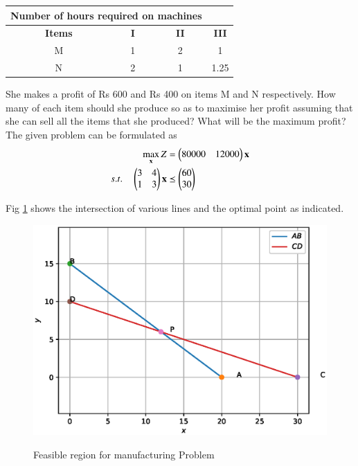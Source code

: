 \begin{enumerate}[label=\arabic*.,ref=\thesection.\theenumi]
\begin{tabular}{|c|c|c|c|}
\hline
 \multicolumn{3}{|l}{\textbf{ Number of hours required on machines}}& \\ \cline{2-4}
\hline
\textbf {Items}&\textbf{I}&\textbf{II}&\textbf{III}\\
\hline
M&1&2&1\\
\hline
 N&2&1&1.25\\
 \hline 

\end{tabular}

She makes a profit of Rs 600 and Rs 400 on items M and N respectively. How many
of each item should she produce so as to maximise her profit assuming that she can sell
all the items that she produced? What will be the maximum profit?
\\
\solution The given problem can be formulated as
\begin{align}
\max_{\mathbf{x}} Z &= \begin{pmatrix}80000&12000\end{pmatrix}\mathbf{x}
\\
s.t. \quad 
\begin{pmatrix}
3 & 4
\\
1 & 3
\end{pmatrix}
\mathbf{x} & \preceq \begin{pmatrix}60\\30\end{pmatrix}
\label{eq:manufacturing}
\end{align}

Fig  \ref{fig:manufacturing}
shows the intersection of various lines and the optimal point as indicated.
\begin{figure}[h]
\includegraphics[width=\columnwidth]{./figs/lp_manufacturing.eps}
\caption{Feasible region for manufacturing Problem}
\caption{}
\label{fig:manufacturing}
\end{figure}


\end{enumerate}
